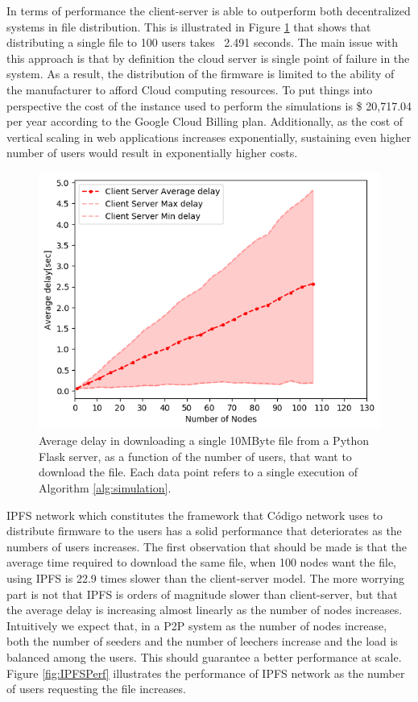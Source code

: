 {{{In terms of performance the client-server is able to outperform both decentralized systems in file distribution. This is illustrated in Figure \ref{fig:CSPerf} that shows that distributing a single file to 100 users takes ~2.491 seconds. The main issue with this approach is that by definition the cloud server is single point of failure in the system. As a result, the distribution of the firmware is limited to the ability of the manufacturer to afford Cloud computing resources. To put things into perspective the cost of the instance used to perform the simulations is \$ 20,717.04 per year according to the Google Cloud Billing plan. Additionally, as the cost of vertical scaling in web applications increases exponentially, sustaining even higher number of users would result in exponentially higher costs.

\begin{figure}[!htb]
\centering
\includegraphics[width=\textwidth]{./results/client-server.png}
\caption{Average delay in downloading a single 10MByte file from a Python Flask server, as a function of the number of users, that want to download the file. Each data point refers to a single execution of Algorithm \ref{alg:simulation}.}
\label{fig:CSPerf}
\end{figure}

IPFS network which constitutes the framework that Código network uses to distribute firmware to the users has a solid performance that deteriorates as the numbers of users increases. The first observation that should be made is that the average time required to download the same file, when 100 nodes want the file, using IPFS is 22.9 times slower than the client-server model. The more worrying part is not that IPFS is orders of magnitude slower than client-server, but that the average delay is increasing almost linearly as the number of nodes increases. Intuitively we expect that, in a P2P system as the number of nodes increase, both the number of seeders and the number of leechers increase and the load is balanced among the users. This should guarantee a better performance at scale. Figure \ref{fig:IPFSPerf} illustrates the performance of IPFS network as the number of users requesting the file increases.

}}}
